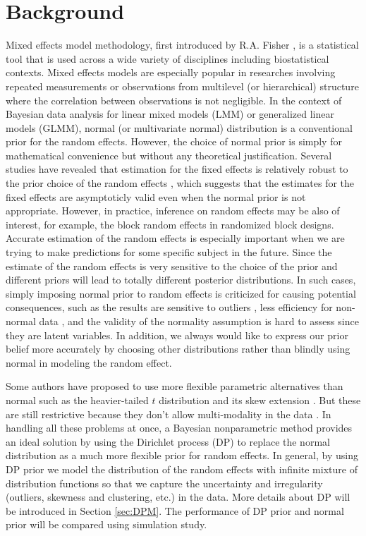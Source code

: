 \documentclass[12pt]{article}
\begin{document}
\section{Background}%
\doublespacing
\indent Mixed effects model methodology, first introduced by R.A. Fisher \cite{fisher1919xv},  is a statistical tool that is used across a wide variety of disciplines including biostatistical contexts. Mixed effects models are especially popular in researches involving repeated measurements or observations from multilevel (or hierarchical) structure where the correlation between observations is not negligible. In the context of Bayesian data analysis for linear mixed models (LMM) or generalized linear models (GLMM), normal (or multivariate normal) distribution is a conventional prior for the random effects. However, the choice of normal prior is simply for mathematical convenience but without any theoretical justification.  Several studies have revealed that estimation for the fixed effects is relatively robust to the prior choice of the random effects \cite{neuhaus1992effects} \cite{butler1992random} \cite{kleinman1998semiparametric}, which suggests that the estimates for the fixed effects are asymptoticly valid even when the normal prior is not appropriate. However, in practice, inference on random effects may be also of interest, for example, the block random effects in randomized block designs. Accurate estimation of the random effects is especially important when we are trying to make predictions for some specific subject in the future. Since the estimate of the random effects is very sensitive to the choice of the prior and different priors will lead to totally different posterior distributions. In such cases, simply imposing normal prior to random effects is criticized for causing potential consequences, such as the results are sensitive to outliers \cite{dunson2010nonparametric}, less efficiency for non-normal data \cite{mehrotra1997non}, and the validity of the normality assumption is hard to assess since they are latent variables. In addition, we always would like to express our prior belief more accurately by choosing other distributions rather than blindly using normal in modeling the random effect. 

Some authors have proposed to use more flexible parametric alternatives than normal such as the heavier-tailed $t$ distribution and its skew extension \cite{lee2008flexible}. But these are still restrictive because they don't allow multi-modality in the data \cite{dunson2010nonparametric}. In handling all these problems at once, a Bayesian nonparametric method provides an ideal solution by using the Dirichlet process (DP) to replace the normal distribution as a much more flexible prior for random effects. In general, by using DP prior we model the distribution of the random effects with infinite mixture of distribution functions so that we capture the uncertainty and irregularity (outliers, skewness and clustering, etc.) in the data. More details about DP will be introduced in Section \ref{sec:DPM}. The performance of DP prior and normal prior will be compared using simulation study.\par
\end{document}
